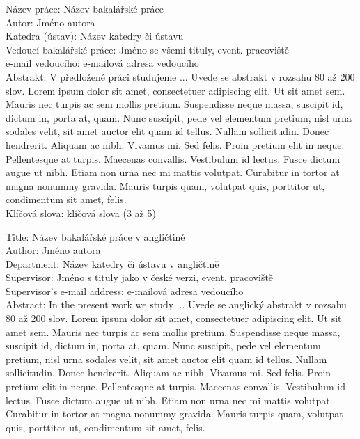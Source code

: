 \documentclass[12pt,notitlepage]{report}
\begin{document}
\tableofcontents %

\newpage %

\noindent
Název práce: Název bakalářské práce\\
Autor: Jméno autora\\
Katedra (ústav): Název katedry či ústavu\\
Vedoucí bakalářské práce: Jméno se všemi tituly, event. pracoviště\\
e-mail vedoucího: e-mailová adresa vedoucího\\

\noindent Abstrakt:  V předložené práci studujeme ... Uvede se abstrakt v rozsahu 80 až 200 slov. Lorem ipsum dolor sit amet, consectetuer adipiscing elit. Ut sit amet sem. Mauris nec turpis ac sem mollis pretium. Suspendisse neque massa, suscipit id, dictum in, porta at, quam. Nunc suscipit, pede vel elementum pretium, nisl urna sodales velit, sit amet auctor elit quam id tellus. Nullam sollicitudin. Donec hendrerit. Aliquam ac nibh. Vivamus mi. Sed felis. Proin pretium elit in neque. Pellentesque at turpis. Maecenas convallis. Vestibulum id lectus. Fusce dictum augue ut nibh. Etiam non urna nec mi mattis volutpat. Curabitur in tortor at magna nonummy gravida. Mauris turpis quam, volutpat quis, porttitor ut, condimentum sit amet, felis.\\

\noindent Klíčová slova: klíčová slova (3 až 5)

\vspace{10mm}

\noindent
Title: Název bakalářské práce v angličtině\\
Author: Jméno autora\\
Department: Název katedry či ústavu v angličtině\\
Supervisor: Jméno s tituly jako v české verzi, event. pracoviště\\
Supervisor's e-mail address: e-mailová adresa vedoucího\\

\noindent Abstract: In the present work we study ... Uvede se anglický abstrakt v rozsahu 80 až 200 slov. Lorem ipsum dolor sit amet, consectetuer adipiscing elit. Ut sit amet sem. Mauris nec turpis ac sem mollis pretium. Suspendisse neque massa, suscipit id, dictum in, porta at, quam. Nunc suscipit, pede vel elementum pretium, nisl urna sodales velit, sit amet auctor elit quam id tellus. Nullam sollicitudin. Donec hendrerit. Aliquam ac nibh. Vivamus mi. Sed felis. Proin pretium elit in neque. Pellentesque at turpis. Maecenas convallis. Vestibulum id lectus. Fusce dictum augue ut nibh. Etiam non urna nec mi mattis volutpat. Curabitur in tortor at magna nonummy gravida. Mauris turpis quam, volutpat quis, porttitor ut, condimentum sit amet, felis. \\
\end{document}
